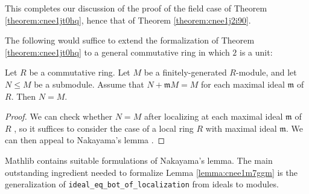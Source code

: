 \documentclass[reqno]{amsart} 
\begin{document}
This completes our discussion of the proof of the field case of Theorem \ref{theorem:cnee1jt0hq}, hence that of Theorem \ref{theorem:cnee1j2i90}.

The following would suffice to extend the formalization of Theorem \ref{theorem:cnee1jt0hq} to a general commutative ring in which $2$ is a unit:
\begin{lemma}\label{lemma:cnee1m7ggm}
Let $R$ be a commutative ring.  Let $M$ be a finitely-generated $R$-module, and let $N \leq M$ be a submodule.  Assume that $N + \mathfrak{m} M = M$ for each maximal ideal $\mathfrak{m}$ of $R$.  Then $N = M$.
\end{lemma}
\begin{proof}
  We can check whether $N = M$ after localizing at each maximal ideal $\mathfrak{m}$ of $R$ \cite[Prop 3.9]{MR3525784}, so it suffices to consider the case of a local ring $R$ with maximal ideal $\mathfrak{m}$.  We can then appeal to Nakayama's lemma \cite[Cor 2.7]{MR3525784}.
\end{proof}
\begin{remark}
  Mathlib contains suitable formulations of Nakayama's lemma.  The main outstanding ingredient needed to formalize Lemma \ref{lemma:cnee1m7ggm} is the generalization of \verb|ideal_eq_bot_of_localization| from ideals to modules.
\end{remark}


{} 
\end{document}
